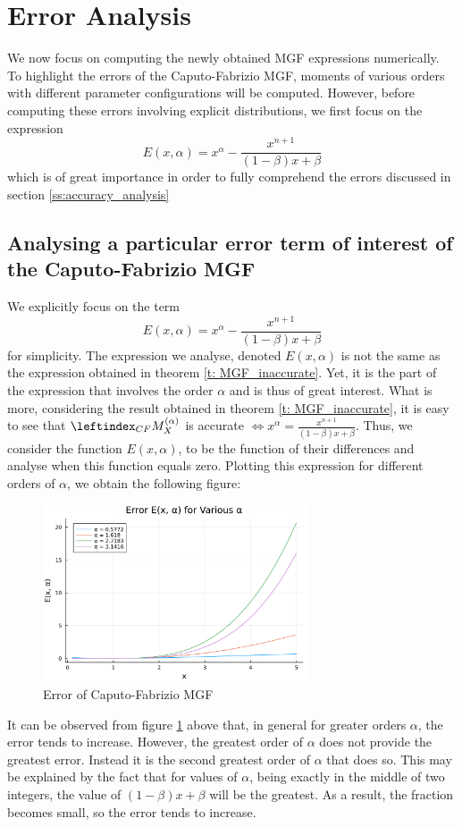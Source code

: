 \section{Error Analysis}\label{s:simulation}
We now focus on computing the newly obtained MGF expressions numerically. To highlight the errors of the Caputo-Fabrizio MGF, moments of various orders with different parameter configurations will be computed. However, before computing these errors involving explicit distributions, we first focus on the expression \[ E(x, \alpha) = x^\alpha - \displaystyle \frac{x^{n+1} }{(1 - \beta)x + \beta}\] which is of great importance in order to fully comprehend the errors discussed in section \ref{ss:accuracy_analysis}

\subsection{Analysing a particular error term of interest of the Caputo-Fabrizio MGF}
We explicitly focus on the term \[ E(x, \alpha) = x^\alpha - \displaystyle \frac{x^{n+1} }{(1 - \beta)x + \beta}\] for simplicity. The expression we analyse, denoted \(E(x, \alpha)\) is not the same as the expression obtained in theorem \ref{t: MGF_inaccurate}. Yet, it is the part of the expression that involves the order \(\alpha\) and is thus of great interest. What is more, considering the result obtained in theorem \ref{t: MGF_inaccurate}, it is easy to see that \(\leftindex_{CF}{M}_X^{(\alpha)}\) is accurate \(\iff x^\alpha = \displaystyle \frac{x^{n+1} }{(1 - \beta)x + \beta}\). Thus, we consider the function \(E(x, \alpha)\), to be the function of their differences and analyse when this function equals zero. Plotting this expression for different orders of \(\alpha\), we obtain the following figure:
\begin{figure}[H]
    \centering
    \includegraphics[width=0.7\textwidth]{figures/error_plot.pdf}
    \caption{Error of Caputo-Fabrizio MGF}
    \label{fig:error_MGF}
\end{figure}
It can be observed from figure \ref{fig:error_MGF} above that, in general for greater orders \(\alpha\), the error tends to increase. However, the greatest order of \(\alpha\) does not provide the greatest error. Instead it is the second greatest order of \(\alpha\) that does so. This may be explained by the fact that for values of \(\alpha\), being exactly in the middle of two integers, the value of \((1 - \beta)x + \beta\) will be the greatest. As a result, the fraction becomes small, so the error tends to increase.

